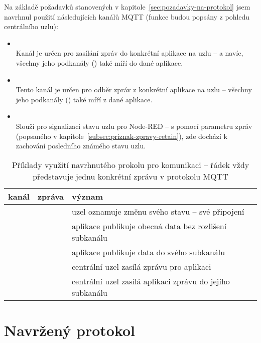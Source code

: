 Na základě požadavků stanovených v kapitole~\ref{sec:pozadavky-na-protokol} jsem navrhnul použití následujících kanálů
MQTT (funkce budou popsány z pohledu centrálního uzlu):

\begin{itemize}
    \item {} \\
    Kanál je určen pro zasílání zpráv do konkrétní aplikace na uzlu -- a navíc,
    všechny jeho podkanály () také míří do dané aplikace.

    \item {} \\
    Tento kanál je určen pro odběr zpráv z konkrétní aplikace na uzlu --
    všechny jeho podkanály () také míří z dané aplikace.

    \item {} \\
    Slouží pro signalizaci stavu uzlu pro Node-RED -- s pomocí parametru zpráv  (popsaného v
    kapitole~\ref{subsec:priznak-zpravy-retain}), zde dochází k zachování posledního známého stavu uzlu.
\end{itemize}

\begin{table}
    \centering
    \caption{Příklady využití navrhnutého prokolu pro komunikaci -- řádek vždy představuje jednu konkrétní zprávu v
    protokolu MQTT}
    \begin{tabularx}{\textwidth}{s|l|s}
        \textbf{kanál} & \textbf{zpráva} & \textbf{význam} \\
        \hline
         &  & uzel  oznamuje změnu svého stavu -- své
        připojení \\

         &  & aplikace publikuje obecná data bez rozlišení
        subkanálu\\

         &  & aplikace publikuje data do svého
        subkanálu  \\

         &  & centrální uzel zasílá zprávu pro aplikaci
         \\

         &  & centrální uzel zasílá aplikaci
         zprávu do jejího subkanálu  \\


    \end{tabularx}
    \label{table:mqtt-subscribes}
\end{table}




\section{Navržený protokol}

